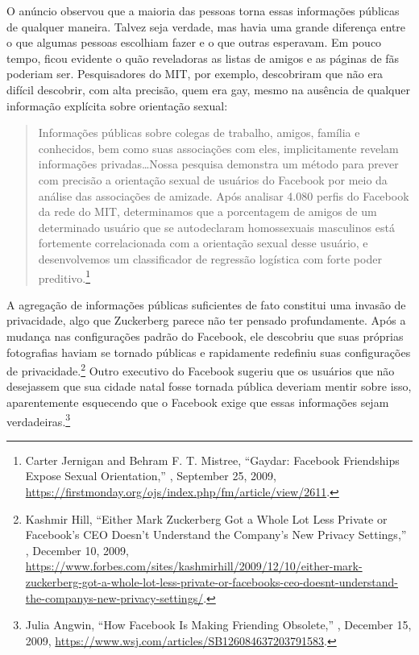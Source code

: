O anúncio observou que a maioria das pessoas torna essas informações públicas de qualquer maneira.
Talvez seja verdade, mas havia uma grande diferença entre o que algumas pessoas escolhiam fazer e
o que outras esperavam. Em pouco tempo, ficou evidente o quão reveladoras as listas de amigos e as
páginas de fãs poderiam ser. Pesquisadores do MIT, por exemplo, descobriram que não era difícil
descobrir, com alta precisão, quem era gay, mesmo na ausência de qualquer informação explícita sobre
orientação sexual:

\begin{quote}
    Informações públicas sobre colegas de trabalho, amigos, família e conhecidos, bem como suas
    associações com eles, implicitamente revelam informações privadas\ldots Nossa pesquisa
    demonstra um método para prever com precisão a orientação sexual de usuários do Facebook por
    meio da análise das associações de amizade. Após analisar 4.080 perfis do Facebook da rede do
    MIT, determinamos que a porcentagem de amigos de um determinado usuário que se autodeclaram
    homossexuais masculinos está fortemente correlacionada com a orientação sexual desse usuário,
    e desenvolvemos um classificador de regressão logística com forte poder preditivo.\footnote{Carter
    Jernigan and Behram F. T. Mistree, ``Gaydar: Facebook Friendships Expose Sexual Orientation,''
    , September 25, 2009,
    \url{https://firstmonday.org/ojs/index.php/fm/article/view/2611}.}
\end{quote}

A agregação de informações públicas suficientes de fato constitui uma invasão de privacidade, algo
que Zuckerberg parece não ter pensado profundamente. Após a mudança nas configurações padrão do
Facebook, ele descobriu que suas próprias fotografias haviam se tornado públicas e rapidamente
redefiniu suas configurações de privacidade.\footnote{Kashmir Hill, ``Either Mark Zuckerberg Got a
Whole Lot Less Private or Facebook’s CEO Doesn’t Understand the Company’s New Privacy Settings,''
, December 10, 2009,
\url{https://www.forbes.com/sites/kashmirhill/2009/12/10/either-mark-zuckerberg-got-a-whole-lot-less-private-or-facebooks-ceo-doesnt-understand-the-companys-new-privacy-settings/}.}
Outro executivo do Facebook sugeriu que os usuários que não desejassem que sua cidade natal fosse
tornada pública deveriam mentir sobre isso, aparentemente esquecendo que o Facebook exige que
essas informações sejam verdadeiras.\footnote{Julia Angwin, ``How Facebook Is Making Friending
Obsolete,'' , December 15, 2009,
\url{https://www.wsj.com/articles/SB126084637203791583}.}

